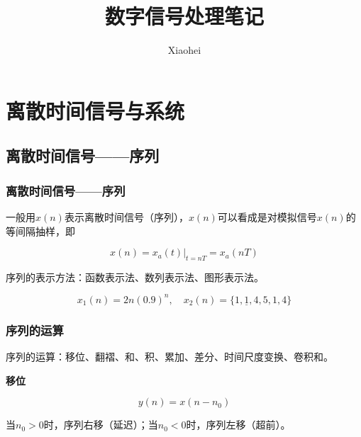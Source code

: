 \documentclass[cn, hazy, blue, normal, 14pt]{elegantnote}
\title{数字信号处理笔记}
\author{Xiaohei}
\institute{Created by Elegant\LaTeX{}}
\date{\zhtoday}
\begin{document}
\maketitle

\section{离散时间信号与系统}

\subsection{离散时间信号——序列}

\subsubsection{离散时间信号——序列}

一般用$x(n)$表示离散时间信号（序列），$x(n)$可以看成是对模拟信号$x(n)$的等间隔抽样，即

\begin{equation}
        x(n)=\left.x_a(t)\right|_{t=nT}=x_a(nT)
\end{equation}

序列的表示方法：函数表示法、数列表示法、图形表示法。

$$x_1(n)=2n(0.9)^n, \quad x_2(n)=\{1, \underline{1}, 4, 5, 1, 4\}$$

\begin{center}
\end{center}

\subsubsection{序列的运算}

序列的运算：移位、翻褶、和、积、累加、差分、时间尺度变换、卷积和。

\textbf{移位}

\begin{equation}
        y(n)=x(n-n_0)
\end{equation}

当$n_0>0$时，序列右移（延迟）；当$n_0<0$时，序列左移（超前）。
\end{document}
